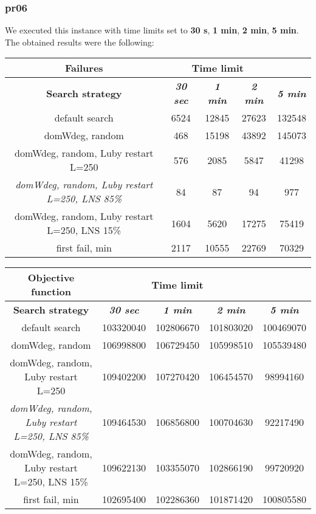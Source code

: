 \subsubsection{pr06}
We executed this instance with time limits set to \textbf{30 s}, \textbf{1 min}, \textbf{2 min}, \textbf{5 min}.\\
The obtained results were the following:
{
\renewcommand{\arraystretch}{2}
\begin{longtable}[h]{| c | c | c | c | c |}
    \hline
    \textbf{Failures} & \multicolumn{3}{c}{Time limit} & \\
    \hline
    \textbf{Search strategy} & \textbf{\textit{30 sec}} & \textbf{\textit{1 min}} & \textbf{\textit{2 min}} & \textbf{\textit{5 min}} \\
    \hline
    \endhead
    default search                                         & 6524 & 12845 &  27623 & 132548 \\
    \hline
    domWdeg, random                                        &  468 & 15198 &  43892 & 145073 \\
    \hline
    domWdeg, random, Luby restart L=250                    &  576 &  2085 &   5847 &  41298 \\
    \hline
    \textit{domWdeg, random, Luby restart L=250, LNS 85\%} &   84 &    87 &     94 &    977 \\
    \hline
    domWdeg, random, Luby restart L=250, LNS 15\%          & 1604 &  5620 &  17275 &  75419 \\
    \hline
    first fail, min                                        & 2117 & 10555 &  22769 &  70329 \\
    \hline
\end{longtable}
}

{
\renewcommand{\arraystretch}{2}
\begin{longtable}[h]{| c | c | c | c | c |}
    \hline
    \textbf{Objective function} & \multicolumn{3}{c}{Time limit} & \\
    \hline
    \textbf{Search strategy} & \textbf{\textit{30 sec}} & \textbf{\textit{1 min}} & \textbf{\textit{2 min}} & \textbf{\textit{5 min}} \\
    \hline
    \endhead
    default search                                         & 103320040 & 102806670 & 101803020 & 100469070 \\
    \hline
    domWdeg, random                                        & 106998800 & 106729450 & 105998510 & 105539480 \\
    \hline
    domWdeg, random, Luby restart L=250                    & 109402200 & 107270420 & 106454570 &  98994160 \\
    \hline
    \textit{domWdeg, random, Luby restart L=250, LNS 85\%} & 109464530 & 106856800 & 100704630 &  92217490 \\
    \hline
    domWdeg, random, Luby restart L=250, LNS 15\%          & 109622130 & 103355070 & 102866190 &  99720920 \\
    \hline
    first fail, min                                        & 102695400 & 102286360 & 101871420 & 100805580 \\
    \hline
\end{longtable}
}
